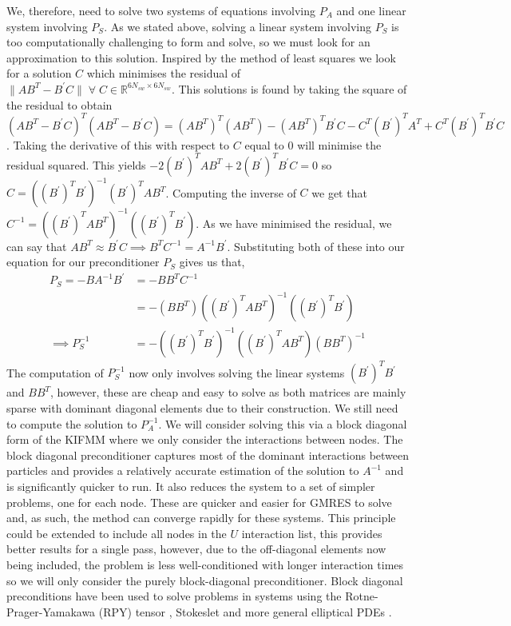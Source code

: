We, therefore, need to solve two systems of equations involving $P_A$ and one linear system involving $P_S$. As we stated above, solving a linear system involving $P_S$ is too computationally challenging to form and solve, so we must look for an approximation to this solution. Inspired by the method of least squares we look for a solution $C$ which minimises the residual of $\lVert AB^T - B^\prime C \rVert \;\forall\; C \in \mathbb{R}^{6N_{sw}\times6N_{sw}}$. This solutions is found by taking the square of the residual to obtain $(AB^T - B^\prime C)^T(AB^T - B^\prime C) = (AB^T)^T(AB^T)-(AB^T)^TB^\prime C-C^T(B^\prime)^TA^T + C^T(B^\prime)^TB^\prime C$. Taking the derivative of this with respect to $C$ equal to $0$ will minimise the residual squared. This yields $-2(B^\prime)^TAB^T + 2(B^\prime)^TB^\prime C=0$ so $C = ((B^\prime)^TB^\prime)^{-1}(B^\prime)^TAB^T$. Computing the inverse of $C$ we get that $C^{-1} = ((B^\prime)^TAB^T)^{-1}((B^\prime)^TB^\prime)$. As we have minimised the residual, we can say that $AB^T \approx B^\prime C \implies B^T C^{-1} = A^{-1}B^\prime$. Substituting both of these into our equation for our preconditioner $P_S$ gives us that, 
\begin{equation}
\begin{aligned}
    P_S = - B A^{-1}B^\prime &= -B B^{T} C^{-1} \\
    & = -(B B^{T})((B^\prime)^TAB^T)^{-1}((B^\prime)^TB^\prime) \\
    \implies P_S^{-1} &= -((B^\prime)^TB^\prime)^{-1}((B^\prime)^TAB^T)(B B^{T})^{-1}
\end{aligned}
\label{eq:PreconS}
\end{equation}
The computation of $P_S^{-1}$ now only involves solving the linear systems $(B^\prime)^TB^\prime$ and $B B^{T}$, however, these are cheap and easy to solve as both matrices are mainly sparse with dominant diagonal elements due to their construction. We still need to compute the solution to $P_A^{-1}$. We will consider solving this via a block diagonal form of the KIFMM where we only consider the interactions between nodes. 
The block diagonal preconditioner captures most of the dominant interactions between particles and provides a relatively accurate estimation of the solution to $A^{-1}$ and is significantly quicker to run. It also reduces the system to a set of simpler problems, one for each node. These are quicker and easier for GMRES to solve and, as such, the method can converge rapidly for these systems. This principle could be extended to include all nodes in the $U$ interaction list, this provides better results for a single pass, however, due to the off-diagonal elements now being included, the problem is less well-conditioned with longer interaction times so we will only consider the purely block-diagonal preconditioner. Block diagonal preconditions have been used to solve problems in systems using the Rotne-Prager-Yamakawa (RPY) tensor \cite{UsabiagaHYDRODYNAMICSAPPROACH}, Stokeslet\cite{Nazockdast2017AMechanics} and more general elliptical PDEs \cite{Ibeid2018FastEquations}. 

